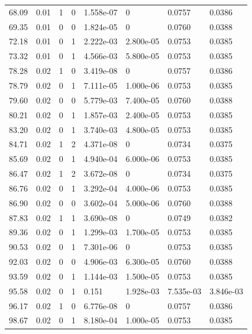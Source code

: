 \documentclass[preview]{standalone}
\begin{document}
{{{\begin{tabular}{L{1.2cm}C{1.2cm} C{0.3cm}C{0.5cm} C{1.4cm}C{1.4cm} C{1.4cm}C{1.4cm}}
  68.09  &  0.01  & 1     &  0 &  1.558e-07  & 0  & 0.0757 &  0.0386   \\ 
  69.35  &  0.01  & 0     &  0 &  1.824e-05  & 0  & 0.0760 &  0.0388   \\ 
  72.18  &  0.01  & 0     &  1 &  2.222e-03  & 2.800e-05  & 0.0753 &  0.0385   \\ 
  73.32  &  0.01  & 0     &  1 &  4.566e-03  & 5.800e-05  & 0.0753 &  0.0385   \\ 
  78.28  &  0.02  & 1     &  0 &  3.419e-08  & 0  & 0.0757 &  0.0386   \\ 
  78.79  &  0.02  & 0     &  1 &  7.111e-05  & 1.000e-06  & 0.0753 &  0.0385   \\ 
  79.60  &  0.02  & 0     &  0 &  5.779e-03  & 7.400e-05  & 0.0760 &  0.0388   \\ 
  80.21  &  0.02  & 0     &  1 &  1.857e-03  & 2.400e-05  & 0.0753 &  0.0385   \\ 
  83.20  &  0.02  & 0     &  1 &  3.740e-03  & 4.800e-05  & 0.0753 &  0.0385   \\ 
  84.71  &  0.02  & 1     &  2 &  4.371e-08  & 0  & 0.0734 &  0.0375   \\ 
  85.69  &  0.02  & 0     &  1 &  4.940e-04  & 6.000e-06  & 0.0753 &  0.0385   \\ 
  86.47  &  0.02  & 1     &  2 &  3.672e-08  & 0  & 0.0734 &  0.0375   \\ 
  86.76  &  0.02  & 0     &  1 &  3.292e-04  & 4.000e-06  & 0.0753 &  0.0385   \\ 
  86.90  &  0.02  & 0     &  0 &  3.602e-04  & 5.000e-06  & 0.0760 &  0.0388   \\ 
  87.83  &  0.02  & 1     &  1 &  3.690e-08  & 0  & 0.0749 &  0.0382   \\ 
  89.36  &  0.02  & 0     &  1 &  1.299e-03  & 1.700e-05  & 0.0753 &  0.0385   \\ 
  90.53  &  0.02  & 0     &  1 &  7.301e-06  & 0  & 0.0753 &  0.0385   \\ 
  92.03  &  0.02  & 0     &  0 &  4.906e-03  & 6.300e-05  & 0.0760 &  0.0388   \\ 
  93.59  &  0.02  & 0     &  1 &  1.144e-03  & 1.500e-05  & 0.0753 &  0.0385   \\ 
  95.58  &  0.02  & 0     &  1 &  0.151  & 1.928e-03  & 7.535e-03 &  3.846e-03   \\ 
  96.17  &  0.02  & 1     &  0 &  6.776e-08  & 0  & 0.0757 &  0.0386   \\ 
  98.67  &  0.02  & 0     &  1 &  8.180e-04  & 1.000e-05  & 0.0753 &  0.0385   \\ 

\end{tabular}}}}
\end{document}
